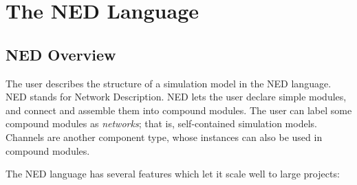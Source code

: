 \chapter{The NED Language}
\label{cha:ned-lang}


\section{NED Overview}
\label{sec:ned-lang:ned-overview}

The user describes the structure of a simulation model in the NED language. NED
stands for Network Description. NED lets the user declare simple modules, and
connect and assemble them into compound modules. The user can label some compound
modules as \textit{networks}; that is, self-contained simulation models. Channels are
another component type, whose instances can also be used in compound modules.

The NED language has several features which let it scale well to large projects:

